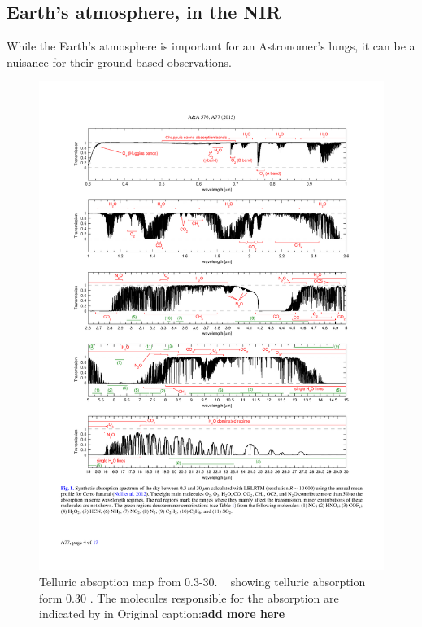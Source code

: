 

\subsection{Earth's atmosphere, in the NIR}
While the Earth's atmosphere is important for an Astronomer's lungs, it can be a nuisance for their ground-based observations.

\begin{figure}
    \centering
    \includegraphics[width=0.9\linewidth]{figures/atmos_and_models/cropped_molecfit_absorption}
    \caption{Telluric absoption map from 0.3-30\um. ~\citet[][Figure~1]{smette_molecfit_2015} showing telluric absorption form 0.30 \um. The molecules responsible for the absorption are indicated by in 
        Original caption:\textbf{add more here}}
    \label{fig:croppedmolecfitabsorbtion}
\end{figure}


